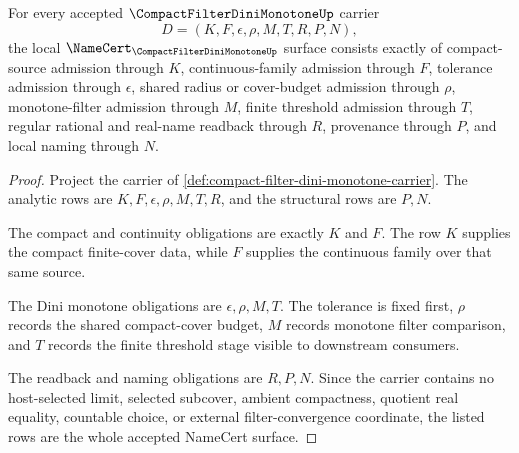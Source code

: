 \begin{theorem}
\label{thm:compact-filter-dini-monotone-obligations}
For every accepted $\CompactFilterDiniMonotoneUp$ carrier
$$
D=(K,F,\epsilon,\rho,M,T,R,P,N),
$$
the local $\NameCert_{\CompactFilterDiniMonotoneUp}$ surface consists exactly of compact-source admission through $K$, continuous-family admission through $F$, tolerance admission through $\epsilon$, shared radius or cover-budget admission through $\rho$, monotone-filter admission through $M$, finite threshold admission through $T$, regular rational and real-name readback through $R$, provenance through $P$, and local naming through $N$.
\end{theorem}
\begin{proof}
Project the carrier of \autoref{def:compact-filter-dini-monotone-carrier}. The analytic rows are $K,F,\epsilon,\rho,M,T,R$, and the structural rows are $P,N$.

The compact and continuity obligations are exactly $K$ and $F$. The row $K$ supplies the compact finite-cover data, while $F$ supplies the continuous family over that same source.

The Dini monotone obligations are $\epsilon,\rho,M,T$. The tolerance is fixed first, $\rho$ records the shared compact-cover budget, $M$ records monotone filter comparison, and $T$ records the finite threshold stage visible to downstream consumers.

The readback and naming obligations are $R,P,N$. Since the carrier contains no host-selected limit, selected subcover, ambient compactness, quotient real equality, countable choice, or external filter-convergence coordinate, the listed rows are the whole accepted NameCert surface.
\end{proof}

